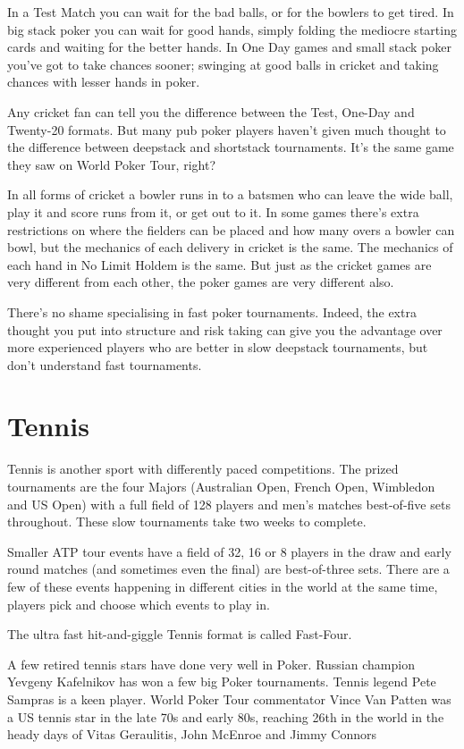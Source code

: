 In a Test Match you can wait for the bad balls, or for the bowlers to
get tired. In big stack poker you can wait for good hands, simply folding the
mediocre starting cards and waiting for the better hands. In One Day games
and small stack poker you've got to take chances sooner; swinging at
good balls in cricket and taking chances with lesser hands in poker.

Any cricket fan can tell you the difference between the Test,
One-Day and Twenty-20 formats. But many pub poker players haven't given
much thought to the difference between deepstack and shortstack
tournaments. It's the same game they saw on World Poker Tour,
right?

In all forms of cricket a bowler runs in to a batsmen who
can leave the wide ball, play it and score runs from it, or get out
to it. In some games there's extra restrictions on where the
fielders can be placed and how many overs a bowler
can bowl, but the mechanics of each delivery in cricket is the same.
The mechanics of each hand in No Limit Holdem is the same.
But just as the cricket games are very different from each other, the
poker games are very different also.

There's no shame specialising in fast poker tournaments. Indeed,
the extra thought you put into structure and risk taking can give
you the advantage over more experienced players who are better in
slow deepstack tournaments, but don't understand fast tournaments.

\section{Tennis}

Tennis is another sport with differently paced competitions.
The prized tournaments are the four Majors (Australian Open,
French Open, Wimbledon and US Open) with a full field of 128 players
and men's matches best-of-five sets throughout. These slow tournaments
take two weeks to complete.

Smaller ATP tour events have a field of 32, 16 or 8 players in the draw
and early round matches (and sometimes even the final) are best-of-three
sets. There are a few of these events happening in different cities in
the world at the same time, players pick and choose which events
to play in.

The ultra fast hit-and-giggle Tennis format is called Fast-Four.

A few retired tennis stars have done very well in Poker. Russian
champion Yevgeny Kafelnikov has won a few big Poker tournaments.
Tennis legend Pete Sampras is a keen player. World Poker Tour
commentator Vince Van Patten was a US tennis star in the late
70s and early 80s, reaching 26th in the world in the heady days
of Vitas Geraulitis, John McEnroe and Jimmy Connors

